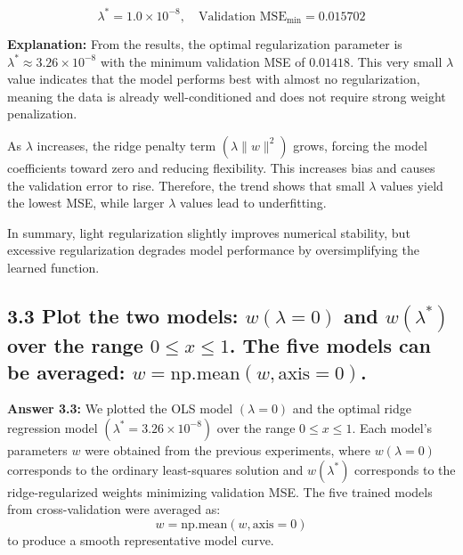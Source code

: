 \documentclass[12pt]{article}
\begin{document}
\[
\boxed{
\lambda^* = 1.0\times10^{-8}, \quad
\text{Validation MSE}_{\min} = 0.015702
}
\]

\textbf{Explanation:}  
From the results, the optimal regularization parameter is $\lambda^* \approx 3.26\times10^{-8}$ 
with the minimum validation MSE of $0.01418$.  
This very small $\lambda$ value indicates that the model performs best with almost no regularization, 
meaning the data is already well-conditioned and does not require strong weight penalization.  

As $\lambda$ increases, the ridge penalty term $(\lambda \|w\|^2)$ grows, 
forcing the model coefficients toward zero and reducing flexibility.  
This increases bias and causes the validation error to rise.  
Therefore, the trend shows that small $\lambda$ values yield the lowest MSE, 
while larger $\lambda$ values lead to underfitting.  

In summary, light regularization slightly improves numerical stability, 
but excessive regularization degrades model performance by oversimplifying the learned function.



\subsection*{3.3
Plot the two models: $w(\lambda=0)$ and $w(\lambda^*)$ over the range $0 \le x \le 1$. The five models can be averaged: $w = \text{np.mean}(w, \text{axis}=0)$.}
\textbf{Answer 3.3:}  
We plotted the OLS model $(\lambda=0)$ and the optimal ridge regression model $(\lambda^*=3.26\times10^{-8})$ over the range $0 \le x \le 1$.  
Each model’s parameters $w$ were obtained from the previous experiments, where $w(\lambda=0)$ corresponds to the ordinary least-squares solution and $w(\lambda^*)$ corresponds to the ridge-regularized weights minimizing validation MSE.  
The five trained models from cross-validation were averaged as:
\[
w = \text{np.mean}(w, \text{axis}=0)
\]
to produce a smooth representative model curve.
\end{document}
